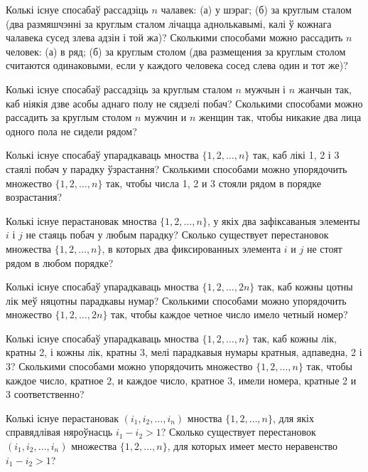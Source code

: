 \begin{problemList}
\bigskip

\problemItemSimple
{Колькі існуе спосабаў рассадзіць $n$ чалавек: (а) у шэраг;
(б) за круглым сталом (два размяшчэнні за круглым сталом лічацца аднолькавымі,
калі ў кожнага чалавека сусед злева адзін і той жа)?}
{Сколькими способами можно рассадить $n$ человек: (а) в ряд; (б) за
круглым столом (два размещения за круглым столом считаются
одинаковыми, если у каждого человека сосед слева один и тот же)?}

\bigskip

\problemItemSimple
{Колькі існуе спосабаў рассадзіць за круглым сталом $n$ мужчын і $n$ жанчын так,
каб ніякія дзве асобы аднаго полу не сядзелі побач?}
{Сколькими способами можно рассадить за круглым столом $n$ мужчин и
$n$ женщин так, чтобы никакие два лица одного пола не сидели рядом?}

\bigskip

\problemItemSimple
{Колькі існуе спосабаў упарадкаваць мноства $\{1, 2, \ldots, n\}$ так,
каб лікі 1, 2 і 3 стаялі побач у парадку ўзрастання?}
{Сколькими способами можно упорядочить множество $\{1, 2, \ldots, n\}$
так, чтобы числа 1, 2 и 3 стояли рядом в порядке возрастания?}

\bigskip

\problemItemSimple
{Колькі існуе перастановак мноства $\{1, 2, \ldots, n\}$, у якіх два зафіксаваныя
элементы $i$ і $j$ не стаяць побач у любым парадку?}
{Сколько существует перестановок множества $\{1, 2, \ldots, n\}$, в
которых два фиксированных элемента $i$ и $j$ не стоят рядом в любом
порядке?}

\bigskip

\problemItemSimple
{Колькі існуе спосабаў упарадкаваць мноства $\{1, 2, \ldots, 2n\}$ так,
каб кожны цотны лік меў няцотны парадкавы нумар?}
{Сколькими способами можно упорядочить множество $\{1, 2, \ldots, 2n\}$
так, чтобы каждое четное число имело четный номер?}

\bigskip

\problemItemSimple
{Колькі існуе спосабаў упарадкаваць мноства $\{1, 2, \ldots, n\}$ так,
каб кожны лік, кратны 2, і кожны лік, кратны 3, мелі парадкавыя нумары кратныя,
адпаведна, 2 і 3?}
{Сколькими способами можно упорядочить множество $\{1, 2, \ldots, n\}$
так, чтобы каждое число, кратное 2, и каждое число, кратное 3, имели
номера, кратные 2 и 3 соответственно?}

\bigskip

\problemItemSimple
{Колькі існуе перастановак $(i_1, i_2, \ldots, i_n)$ мноства $\{1, 2, \ldots, n\}$,
для якіх справядлівая няроўнасць $i_1 - i_2 > 1$?}
{Сколько существует перестановок $(i_1, i_2, \ldots, i_n)$ множества
$\{1, 2, \ldots, n\}$, для которых имеет место неравенство
$i_1 - i_2 > 1$?}

\end{problemList}

